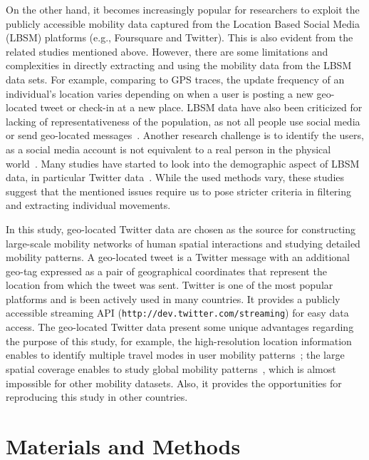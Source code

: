 \documentclass[]{tGIS2e}
\begin{document}
On the other hand, it becomes increasingly popular for researchers to exploit the publicly accessible mobility data captured from the Location Based Social Media (LBSM) platforms (e.g., Foursquare and Twitter).
This is also evident from the related studies mentioned above.
However, there are some limitations and complexities in directly extracting and using the mobility data from the LBSM data sets. 
For example, comparing to GPS traces, the update frequency of an individual's location varies depending on when a user is posting a new geo-located tweet or check-in at a new place.
LBSM data have also been criticized for lacking of representativeness of the population, as not all people use social media or send geo-located messages~\citep{kung2014}. 
Another research challenge is to identify the users, as a social media account is not equivalent to a real person in the physical world~\citep{tsou2015}.
Many studies have started to look into the demographic aspect of LBSM data, in particular Twitter data~\citep{steiger2015,luo2016}. 
While the used methods vary, these studies suggest that the mentioned issues require us to pose stricter criteria in filtering and extracting individual movements.

In this study, geo-located Twitter data are chosen as the source for constructing large-scale mobility networks of human spatial interactions and studying detailed mobility patterns.
A geo-located tweet is a Twitter message with an additional geo-tag expressed as a pair of geographical coordinates that represent the location from which the tweet was sent.
Twitter is one of the most popular platforms and is been actively used in many countries. 
It provides a publicly accessible streaming API ({\tt{http://dev.twitter.com/streaming}}) for easy data access.
The geo-located Twitter data present some unique advantages regarding the purpose of this study, for example, the high-resolution location information enables to identify multiple travel modes in user mobility patterns~\citep{jurdak2015}; the large spatial coverage enables to study global mobility patterns~\citep{hawelka}, which is almost impossible for other mobility datasets. Also, it provides the opportunities for reproducing this study in other countries.

\section{Materials and Methods}
\end{document}
